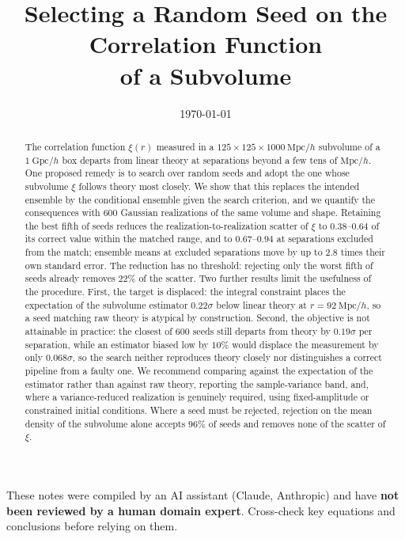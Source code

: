 \documentclass[12pt]{article}
\title{Selecting a Random Seed on the Correlation Function\\
       of a Subvolume}
\author{}
\date{\today}
\newcommand{\Mpch}{\ \mathrm{Mpc}/h}
\begin{document}
\maketitle

\begin{tcolorbox}[colback=yellow!10!white, colframe=orange!75!black,
                  title={\bfseries Disclaimer}]
These notes were compiled by an AI assistant (Claude, Anthropic) and have
\textbf{not been reviewed by a human domain expert}.  Cross-check key
equations and conclusions before relying on them.
\end{tcolorbox}

\begin{abstract}
\noindent
The correlation function $\xi(r)$ measured in a $125 \times 125 \times
1000\Mpch$ subvolume of a $1\ \mathrm{Gpc}/h$ box departs from linear theory at
separations beyond a few tens of $\mathrm{Mpc}/h$.  One proposed remedy is to
search over random seeds and adopt the one whose subvolume $\xi$ follows theory
most closely.  We show that this replaces the intended ensemble by the
conditional ensemble given the search criterion, and we quantify the
consequences with 600 Gaussian realizations of the same volume and shape.
Retaining the best fifth of seeds reduces the realization-to-realization
scatter of $\xi$ to $0.38$--$0.64$ of its correct value within the matched
range, and to $0.67$--$0.94$ at separations excluded from the match; ensemble
means at excluded separations move by up to $2.8$ times their own standard
error.  The reduction has no threshold: rejecting only the worst fifth of seeds
already removes $22\%$ of the scatter.  Two further results limit the
usefulness of the procedure.  First, the target is displaced: the integral
constraint places the expectation of the subvolume estimator $0.22\sigma$ below
linear theory at $r = 92\Mpch$, so a seed matching raw theory is atypical by
construction.  Second, the objective is not attainable in practice: the closest
of 600 seeds still departs from theory by $0.19\sigma$ per separation, while an
estimator biased low by $10\%$ would displace the measurement by only
$0.068\sigma$, so the search neither reproduces theory closely nor
distinguishes a correct pipeline from a faulty one.  We recommend comparing
against the expectation of the estimator rather than against raw theory,
reporting the sample-variance band, and, where a variance-reduced realization
is genuinely required, using fixed-amplitude or constrained initial conditions.
Where a seed must be rejected, rejection on the mean density of the subvolume
alone accepts $96\%$ of seeds and removes none of the scatter of $\xi$.
\end{abstract}
\end{document}
